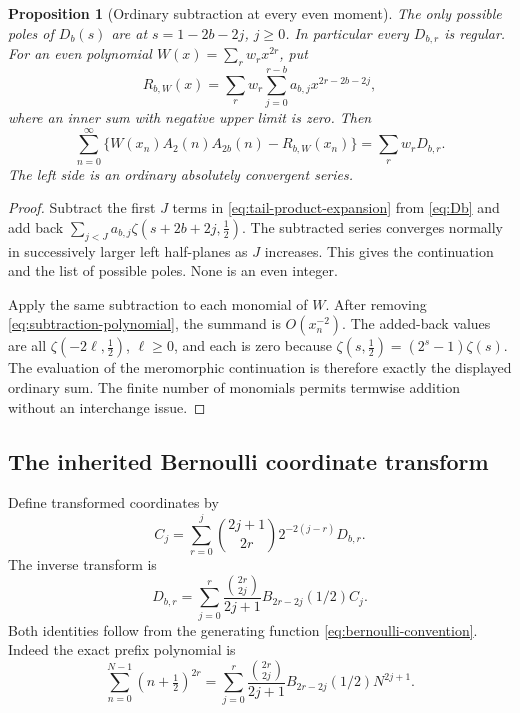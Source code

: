 \documentclass[11pt,letterpaper]{article}
\newtheorem{proposition}[theorem]{Proposition}
\theoremstyle{definition}
\theoremstyle{remark}
\numberwithin{equation}{section}
\begin{document}
\begin{proposition}[Ordinary subtraction at every even moment]
\label{prop:ordinary-subtraction}
The only possible poles of $D_b(s)$ are at
$s=1-2b-2j$, $j\geq0$. In particular every $D_{b,r}$ is regular.
For an even polynomial $W(x)=\sum_r w_rx^{2r}$, put
\begin{equation}\label{eq:subtraction-polynomial}
 R_{b,W}(x)=
 \sum_r w_r\sum_{j=0}^{r-b}a_{b,j}x^{2r-2b-2j},
\end{equation}
where an inner sum with negative upper limit is zero. Then
\begin{equation}\label{eq:ordinary-subtraction}
 \sum_{n=0}^{\infty}
  \{W(x_n)A_2(n)A_{2b}(n)-R_{b,W}(x_n)\}
 =\sum_r w_rD_{b,r}.
\end{equation}
The left side is an ordinary absolutely convergent series.
\end{proposition}
\begin{proof}
Subtract the first $J$ terms in \eqref{eq:tail-product-expansion} from
\eqref{eq:Db} and add back
$\sum_{j<J}a_{b,j}\zeta(s+2b+2j,\tfrac12)$.
The subtracted series converges normally in successively larger left
half-planes as $J$ increases. This gives the continuation and the list
of possible poles. None is an even integer.

Apply the same subtraction to each monomial of $W$. After removing
\eqref{eq:subtraction-polynomial}, the summand is $O(x_n^{-2})$.
The added-back values are all $\zeta(-2\ell,\tfrac12)$, $\ell\geq0$,
and each is zero because
$\zeta(s,\tfrac12)=(2^s-1)\zeta(s)$.
The evaluation of the meromorphic continuation is therefore exactly
the displayed ordinary sum. The finite number of monomials permits
termwise addition without an interchange issue.
\end{proof}

\subsection{The inherited Bernoulli coordinate transform}

Define transformed coordinates by
\begin{equation}\label{eq:C-from-D}
 C_j=\sum_{r=0}^j\binom{2j+1}{2r}2^{-2(j-r)}D_{b,r}.
\end{equation}
The inverse transform is
\begin{equation}\label{eq:D-from-C}
 D_{b,r}=\sum_{j=0}^r
   \frac{\binom{2r}{2j}}{2j+1}B_{2r-2j}(1/2)C_j.
\end{equation}
Both identities follow from the generating function
\eqref{eq:bernoulli-convention}. Indeed the exact prefix polynomial is
\begin{equation}\label{eq:prefix-polynomial}
 \sum_{n=0}^{N-1}(n+\tfrac12)^{2r}
 =\sum_{j=0}^r\frac{\binom{2r}{2j}}{2j+1}
       B_{2r-2j}(1/2)N^{2j+1}.
\end{equation}
\end{document}
